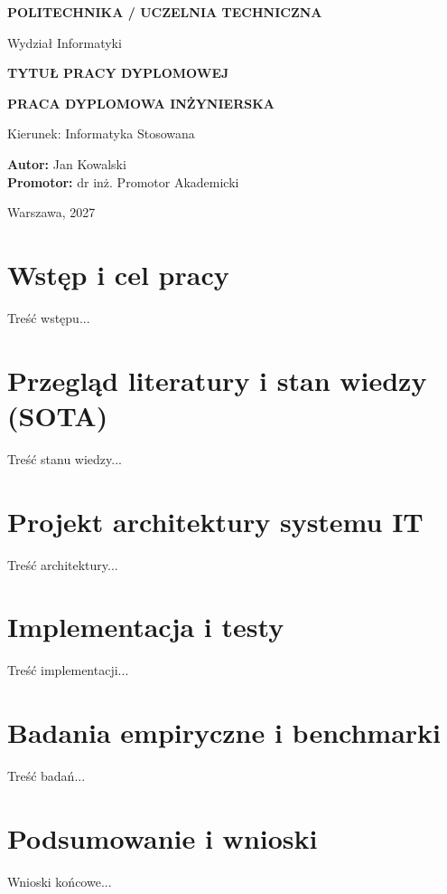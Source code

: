 \documentclass[12pt,a4paper,twoside]{report}
\begin{document}
\begin{titlepage}
    \centering
    \vspace*{1cm}
    {\Large\textbf{POLITECHNIKA / UCZELNIA TECHNICZNA}\par}
    {\large Wydział Informatyki\par}
    \vspace{3cm}
    {\LARGE\textbf{\MakeUppercase{Tytuł Pracy Dyplomowej}}\par}
    \vspace{2cm}
    {\large\textbf{PRACA DYPLOMOWA INŻYNIERSKA}\par}
    {\large Kierunek: Informatyka Stosowana\par}
    \vspace{3cm}
    \begin{flushleft}
        \textbf{Autor:} Jan Kowalski \\
        \textbf{Promotor:} dr inż. Promotor Akademicki
    \end{flushleft}
    \vfill
    {\large Warszawa, 2027\par}
\end{titlepage}

\tableofcontents
\newpage

\chapter{Wstęp i cel pracy}
Treść wstępu...

\chapter{Przegląd literatury i stan wiedzy (SOTA)}
Treść stanu wiedzy...

\chapter{Projekt architektury systemu IT}
Treść architektury...

\chapter{Implementacja i testy}
Treść implementacji...

\chapter{Badania empiryczne i benchmarki}
Treść badań...

\chapter{Podsumowanie i wnioski}
Wnioski końcowe...

\printbibliography[heading=bibintoc,title={Bibliografia}]
\end{document}
